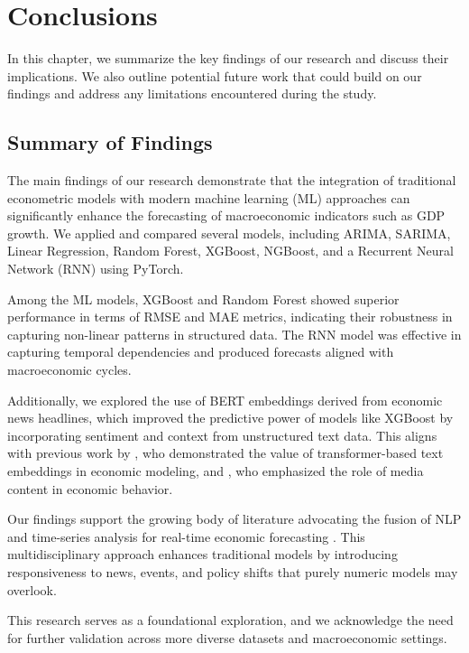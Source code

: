\chapter{Conclusions}
\justifying
\label{chap:conclusions}

In this chapter, we summarize the key findings of our research and discuss their implications. We also outline potential future work that could build on our findings and address any limitations encountered during the study.

\section{Summary of Findings}
\label{sec:summary-findings}

The main findings of our research demonstrate that the integration of traditional econometric models with modern machine learning (ML) approaches can significantly enhance the forecasting of macroeconomic indicators such as GDP growth. We applied and compared several models, including ARIMA, SARIMA, Linear Regression, Random Forest, XGBoost, NGBoost, and a Recurrent Neural Network (RNN) using PyTorch.

Among the ML models, XGBoost and Random Forest showed superior performance in terms of RMSE and MAE metrics, indicating their robustness in capturing non-linear patterns in structured data. The RNN model was effective in capturing temporal dependencies and produced forecasts aligned with macroeconomic cycles.

Additionally, we explored the use of BERT embeddings derived from economic news headlines, which improved the predictive power of models like XGBoost by incorporating sentiment and context from unstructured text data. This aligns with previous work by \citet{arora2021economicbert}, who demonstrated the value of transformer-based text embeddings in economic modeling, and \citet{gentzkow2019measuring}, who emphasized the role of media content in economic behavior.

Our findings support the growing body of literature advocating the fusion of NLP and time-series analysis for real-time economic forecasting \citep{baker2021forecasting, ng2022text}. This multidisciplinary approach enhances traditional models by introducing responsiveness to news, events, and policy shifts that purely numeric models may overlook.

This research serves as a foundational exploration, and we acknowledge the need for further validation across more diverse datasets and macroeconomic settings.


